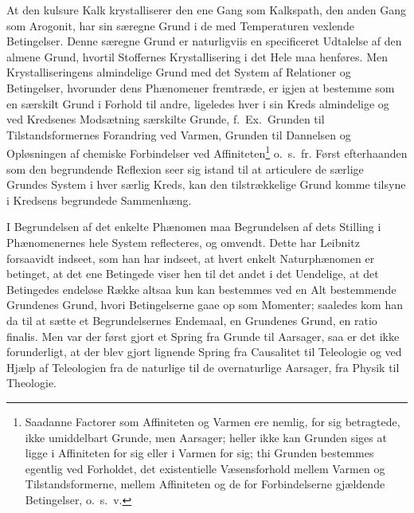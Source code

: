 \documentclass[12pt]{book}
\newcommand{\opage}[1]{\marginnote{\footnotesize\textit{[#1]}}}
\begin{document}
\opage{103} At den kulsure Kalk krystalliserer den ene Gang som Kalkspath, den anden Gang som
Arogonit, har sin særegne Grund i de med Temperaturen vexlende Betingelser. Denne
særegne Grund er naturligviis en specificeret Udtalelse af den almene Grund, hvortil
Stoffernes Krystallisering i det Hele maa henføres. Men Krystalliseringens almindelige
Grund med det System af Relationer og Betingelser, hvorunder dens Phænomener
fremtræde, er igjen at bestemme som en særskilt Grund i Forhold til andre, ligeledes
hver i sin Kreds almindelige og ved Kredsenes Modsætning særskilte Grunde, f.\ Ex.\
Grunden til Tilstandsformernes Forandring ved Varmen, Grunden til Dannelsen og
Opløsningen af chemiske Forbindelser ved Affiniteten\footnote{Saadanne Factorer som
Affiniteten og Varmen ere nemlig, for sig betragtede, ikke umiddelbart Grunde, men
Aarsager; heller ikke kan Grunden siges at ligge i Affiniteten for sig eller i Varmen
for sig; thi Grunden bestemmes egentlig ved Forholdet, det existentielle
Væsensforhold mellem Varmen og Tilstandsformerne, mellem Affiniteten og de for
Forbindelserne gjældende Betingelser, o.\ s.\ v.} o.\ s.\ fr. Først efterhaanden som
den begrundende Reflexion seer sig istand til at articulere de særlige Grundes System
i hver særlig Kreds, kan den tilstrækkelige Grund komme tilsyne i Kredsens begrundede
Sammenhæng.

I Begrundelsen af det enkelte Phænomen maa Begrundelsen af dets Stilling i
Phænomenernes hele System reflecteres, og omvendt. Dette har Leibnitz forsaavidt
indseet, som han har indseet, at hvert enkelt Naturphænomen er betinget, at det ene
Betingede viser hen til det andet i det Uendelige, at det Betingedes endeløse Række
altsaa kun kan bestemmes ved en Alt bestemmende Grundenes Grund, hvori Betingelserne
gaae op som Momenter; saaledes kom han da til at sætte et Begrundelsernes Endemaal, en
Grundenes Grund, en ratio finalis. Men var der først gjort et Spring fra Grunde til
Aarsager, saa er det ikke forunderligt, at der blev gjort lignende Spring fra
Causalitet
\opage{104} til Teleologie og ved Hjælp af Teleologien fra de naturlige til de overnaturlige
Aarsager, fra Physik til Theologie.
\end{document}
